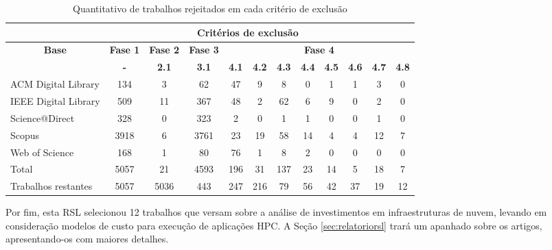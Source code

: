 \documentclass[tese,capa]{texufpel}
\begin{document}
\begin{table}[H]
  \footnotesize
  \centering
  \caption{Quantitativo de trabalhos rejeitados em cada critério de exclusão}
  \label{tab:quantitativos}
  \begin{tabular}{lccccccccccc}
    \cline{2-12}
     & \multicolumn{10}{c}{\textbf{Critérios de exclusão}} \\ 
    \hline
    \multicolumn{1}{c}{\multirow{2}{*}{\textbf{Base}}} & 
    \multicolumn{1}{c}{\textbf{Fase 1}} & 
    \multicolumn{1}{c}{\textbf{Fase 2}} & 
    \multicolumn{1}{c}{\textbf{Fase 3}} & 
    \multicolumn{8}{c}{\textbf{Fase 4}} \\ 
    \cline{2-12} 
    \multicolumn{1}{c}{} & 
    \multicolumn{1}{c}{\textbf{-}} & 
    \multicolumn{1}{c}{\textbf{2.1}} & 
    \multicolumn{1}{c}{\textbf{3.1}} & 
    \multicolumn{1}{c}{\textbf{4.1}} & 
    \multicolumn{1}{c}{\textbf{4.2}} & 
    \multicolumn{1}{c}{\textbf{4.3}} & 
    \multicolumn{1}{c}{\textbf{4.4}} & 
    \multicolumn{1}{c}{\textbf{4.5}} & 
    \multicolumn{1}{c}{\textbf{4.6}} &
    \multicolumn{1}{c}{\textbf{4.7}} & 
    \multicolumn{1}{c}{\textbf{4.8}} \\ 
    \hline
    ACM Digital Library   & 134   & 3     & 62    & 47  & 9   & 8   & 0   & 1   & 1   & 3   & 0 \\
    \addlinespace[0.25cm]
    IEEE Digital Library  & 509   & 11    & 367   & 48  & 2   & 62  & 6   & 9   & 0   & 2   & 0 \\
    \addlinespace[0.25cm]
    Science@Direct        & 328   & 0     & 323   & 2   & 0   & 1   & 1   & 0   & 0   & 1   & 0 \\
    \addlinespace[0.25cm]
    Scopus                & 3918  & 6     & 3761  & 23  & 19  & 58  & 14  & 4   & 4   & 12  & 7 \\
    \addlinespace[0.25cm]
    Web of Science        & 168   & 1     & 80    & 76  & 1   & 8   & 2   & 0   & 0   & 0   & 0 \\ 
    \hline
    Total                 & 5057  & 21    & 4593  & 196 & 31  & 137 & 23  & 14  & 5   & 18  & 7 \\
    Trabalhos restantes   & 5057  & 5036  & 443   & 247 & 216 & 79  & 56  & 42  & 37  & 19  & 12 \\ \hline
  \end{tabular}
\end{table}

Por fim, esta RSL selecionou 12 trabalhos que versam sobre a análise de investimentos em infraestruturas de nuvem, levando em consideração modelos de custo para execução de aplicações HPC. A Seção \ref{sec:relatoriorsl} trará um apanhado sobre os artigos, apresentando-os com maiores detalhes.
\end{document}
